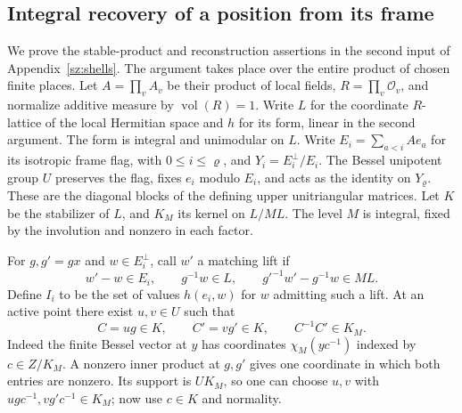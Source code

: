 \subsection{Integral recovery of a position from its frame}
\label{app:local-frame-recovery}
We prove the stable-product and reconstruction assertions in the second
input of Appendix~\ref{sz:shells}.  The argument takes place over the
entire product of chosen finite places.  Let $A=\prod_v A_v$ be their
product of local fields, $R=\prod_v\mathcal O_v$, and normalize additive
measure by $\operatorname{vol}(R)=1$.  Write $L$ for the coordinate
$R$-lattice of the local Hermitian space and $h$ for its form, linear in
the second argument.  The form is integral and unimodular on $L$.
Write $E_i=\sum_{a<i} A e_a$ for its isotropic frame flag, with
$0\le i\le\varrho$, and $Y_i=E_i^\perp/E_i$.  The Bessel unipotent
group $U$ preserves the flag, fixes $e_i$ modulo $E_i$, and acts
as the identity on $Y_{\varrho}$.  These are the diagonal blocks
of the defining upper unitriangular matrices.  Let $K$ be the
stabilizer of $L$, and $K_M$ its kernel on $L/ML$.  The level $M$
is integral, fixed by the involution and nonzero in each factor.

For $g,g'=gx$ and $w\in E_i^\perp$, call $w'$ a matching lift if
\[
  w'-w\in E_i,\qquad g^{-1}w\in L,\qquad
  g'^{-1}w'-g^{-1}w\in ML .
\]
Define $I_i$ to be the set of values $h(e_i,w)$ for $w$ admitting such
a lift.  At an active point there exist $u,v\in U$ such that
\[
 C=ug\in K,\qquad C'=vg'\in K,\qquad C^{-1}C'\in K_M .
 \tag{*}
\]
Indeed the finite Bessel vector at $y$ has coordinates
$\chi_M(yc^{-1})$ indexed by $c\in Z/K_M$. A nonzero inner product at
$g,g'$ gives one coordinate in which both entries are nonzero. Its
support is $U K_M$, so one can choose $u,v$ with
$ugc^{-1},vg'c^{-1}\in K_M$; now use $c\in K$ and normality.

